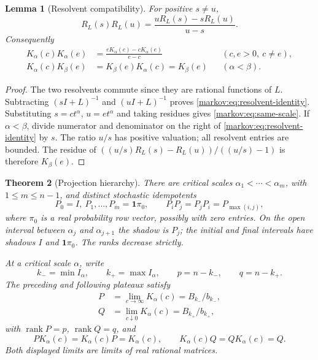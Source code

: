\documentclass[11pt]{article}
\numberwithin{equation}{section}
\newtheorem{theorem}{Theorem}[section]
\newtheorem{lemma}[theorem]{Lemma}
\theoremstyle{definition}
\theoremstyle{remark}
\newcommand{\one}{\mathbf 1}
\newcommand{\rank}{\operatorname{rank}}
\begin{document}
\begin{lemma}[Resolvent compatibility]\label{markov:lem:resolvent}
For positive $s\ne u$,
\begin{equation}\label{markov:eq:resolvent-identity}
 R_L(s)R_L(u)=\frac{uR_L(s)-sR_L(u)}{u-s}.
\end{equation}
Consequently
\begin{align}
 K_\alpha(c)K_\alpha(e)
   &=\frac{eK_\alpha(c)-cK_\alpha(e)}{e-c}
       &&(c,e>0,\ c\ne e),\label{markov:eq:same-scale}\\
 K_\alpha(c)K_\beta(e)
   &=K_\beta(e)K_\alpha(c)=K_\beta(e)
       &&(\alpha<\beta).\label{markov:eq:cross-scale}
\end{align}
\end{lemma}

\begin{proof}
The two resolvents commute since they are rational functions of $L$.
Subtracting $(sI+L)^{-1}$ and $(uI+L)^{-1}$ proves
\eqref{markov:eq:resolvent-identity}. Substituting $s=ct^\alpha$, $u=et^\alpha$ and
taking residues gives \eqref{markov:eq:same-scale}. If $\alpha<\beta$, divide numerator
and denominator on the right of \eqref{markov:eq:resolvent-identity} by $s$. The ratio
$u/s$ has positive valuation; all resolvent entries are bounded. The residue of
$((u/s)R_L(s)-R_L(u))/((u/s)-1)$ is therefore $K_\beta(e)$.
\end{proof}

\begin{theorem}[Projection hierarchy]\label{markov:thm:flag}
There are critical scales $\alpha_1<\cdots<\alpha_m$, with $1\le m\le n-1$,
and distinct stochastic idempotents
\begin{equation}\label{markov:eq:flag}
 P_0=I,\ P_1,\ldots,P_m=\one\pi_0,
 \qquad P_iP_j=P_jP_i=P_{\max(i,j)},
\end{equation}
where $\pi_0$ is a real probability row vector, possibly with zero entries.
On the open interval between $\alpha_j$ and $\alpha_{j+1}$ the shadow is $P_j$;
the initial and final intervals have shadows $I$ and $\one\pi_0$.
The ranks decrease strictly.

At a critical scale $\alpha$, write
\[
 k_-=\min I_\alpha,\qquad k_+=\max I_\alpha,
 \qquad p=n-k_-,\qquad q=n-k_+.
\]
The preceding and following plateaux satisfy
\begin{align}
 P&=\lim_{c\to\infty}K_\alpha(c)=B_{k_-}/b_{k_-},\label{markov:eq:fast-endpoint}\\
 Q&=\lim_{c\downarrow0}K_\alpha(c)=B_{k_+}/b_{k_+},\label{markov:eq:slow-endpoint}
\end{align}
with $\rank P=p$, $\rank Q=q$, and
\begin{equation}\label{markov:eq:endpoint-relations}
 PK_\alpha(c)=K_\alpha(c)P=K_\alpha(c),\qquad
 K_\alpha(c)Q=QK_\alpha(c)=Q.
\end{equation}
Both displayed limits are limits of real rational matrices.
\end{theorem}
\end{document}
